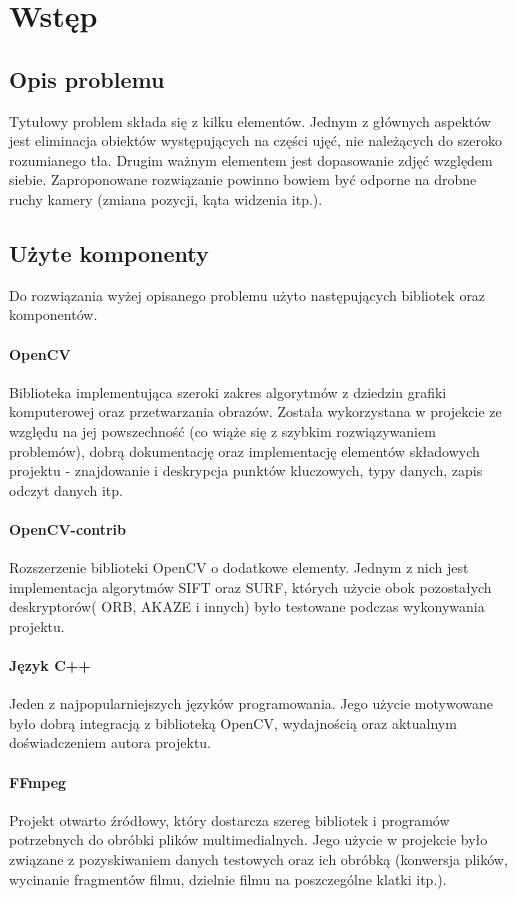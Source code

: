 \chapter{Wstęp}
\section{Opis problemu}
Tytułowy problem składa się z kilku elementów. Jednym z głównych aspektów jest eliminacja obiektów występujących na części ujęć, nie należących do szeroko rozumianego tła. Drugim ważnym elementem jest dopasowanie zdjęć względem siebie. Zaproponowane rozwiązanie powinno bowiem być odporne na drobne ruchy kamery (zmiana pozycji, kąta widzenia itp.). 
\section{Użyte komponenty}
Do rozwiązania wyżej opisanego problemu użyto następujących bibliotek oraz komponentów.
\subsubsection{OpenCV}
Biblioteka implementująca szeroki zakres algorytmów z dziedzin grafiki komputerowej oraz przetwarzania obrazów. Została wykorzystana w projekcie ze względu na jej powszechność (co wiąże się z szybkim rozwiązywaniem problemów), dobrą dokumentację oraz implementację elementów składowych projektu - znajdowanie i deskrypcja punktów kluczowych, typy danych, zapis odczyt danych itp.
\subsubsection{OpenCV-contrib}
Rozszerzenie biblioteki OpenCV o dodatkowe elementy. Jednym z nich jest implementacja algorytmów SIFT oraz SURF, których użycie obok pozostałych deskryptorów( ORB, AKAZE i innych) było testowane podczas wykonywania projektu. 
\subsubsection{Język C++}
Jeden z najpopularniejszych języków programowania. Jego użycie motywowane było dobrą integracją z biblioteką OpenCV, wydajnością oraz aktualnym doświadczeniem autora projektu.
\newpage
\subsubsection{FFmpeg}
Projekt otwarto źródłowy, który dostarcza szereg bibliotek i programów potrzebnych do obróbki plików multimedialnych. Jego użycie w projekcie było związane z pozyskiwaniem danych testowych oraz ich obróbką (konwersja plików, wycinanie fragmentów filmu, dzielnie filmu na poszczególne klatki itp.).
